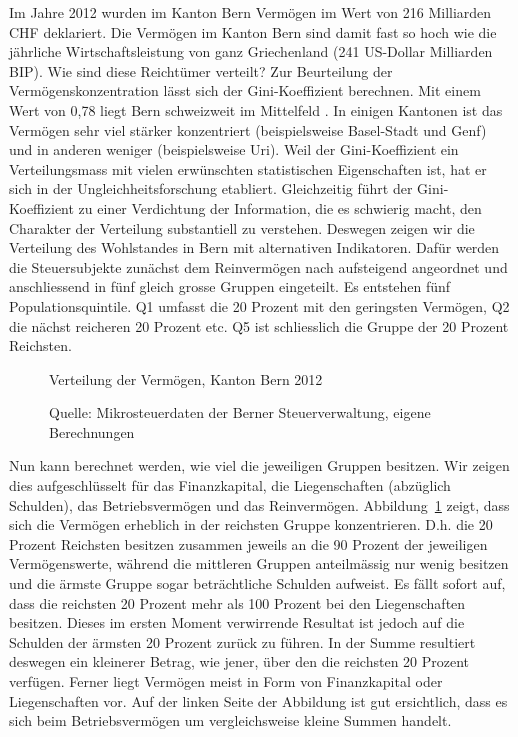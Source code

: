 \documentclass[a4paper, 12pt,liststotoc]{scrartcl}
\numberwithin{equation}{section}
\begin{document}
Im Jahre 2012 wurden im Kanton Bern Vermögen im Wert von 216 Milliarden
CHF deklariert. Die Vermögen im Kanton Bern sind damit fast so hoch wie
die jährliche Wirtschaftsleistung von ganz Griechenland (241 US-Dollar
Milliarden BIP). Wie sind diese Reichtümer verteilt? Zur Beurteilung der
Vermögenskonzentration lässt sich der Gini-Koeffizient berechnen. Mit
einem Wert von 0,78 liegt Bern schweizweit im Mittelfeld \parencite{jann2014}. In einigen Kantonen ist das Vermögen sehr viel stärker
konzentriert (beispielsweise Basel-Stadt und Genf) und in anderen
weniger (beispielsweise Uri). Weil der Gini-Koeffizient ein
Verteilungsmass mit vielen erwünschten statistischen Eigenschaften ist,
hat er sich in der Ungleichheitsforschung etabliert. Gleichzeitig führt
der Gini-Koeffizient zu einer Verdichtung der Information, die es
schwierig macht, den Charakter der Verteilung substantiell zu verstehen.
Deswegen zeigen wir die Verteilung des Wohlstandes in Bern mit
alternativen Indikatoren. Dafür werden die Steuersubjekte zunächst dem
Reinvermögen nach aufsteigend angeordnet und anschliessend in fünf
gleich grosse Gruppen eingeteilt. Es entstehen fünf Populationsquintile.
Q1 umfasst die 20 Prozent mit den geringsten Vermögen, Q2 die nächst
reicheren 20 Prozent etc. Q5 ist schliesslich die Gruppe der 20 Prozent
Reichsten.

\begin{figure}[!ht]
  \caption{Verteilung der Vermögen, Kanton Bern 2012}
  \label{fig:verteilung_vermoegen}
  \centering
  \caption*{Quelle: Mikrosteuerdaten der Berner Steuerverwaltung, eigene Berechnungen}
\end{figure}

Nun kann berechnet werden, wie viel die jeweiligen Gruppen besitzen. Wir
zeigen dies aufgeschlüsselt für das Finanzkapital, die Liegenschaften
(abzüglich Schulden), das Betriebsvermögen und das Reinvermögen. Abbildung~\ref{fig:verteilung_vermoegen}
 zeigt, dass sich die Vermögen erheblich in der reichsten Gruppe
konzentrieren. D.h. die 20 Prozent Reichsten besitzen zusammen jeweils
an die 90 Prozent der jeweiligen Vermögenswerte, während die mittleren
Gruppen anteilmässig nur wenig besitzen und die ärmste Gruppe sogar
beträchtliche Schulden aufweist. Es fällt sofort auf, dass die reichsten
20 Prozent mehr als 100 Prozent bei den Liegenschaften besitzen. Dieses
im ersten Moment verwirrende Resultat ist jedoch auf die Schulden der
ärmsten 20 Prozent zurück zu führen. In der Summe resultiert deswegen
ein kleinerer Betrag, wie jener, über den die reichsten 20 Prozent
verfügen. Ferner liegt Vermögen meist in Form von Finanzkapital oder
Liegenschaften vor. Auf der linken Seite der Abbildung ist gut ersichtlich,
dass es sich beim Betriebsvermögen um vergleichsweise kleine Summen
handelt.
\end{document}
